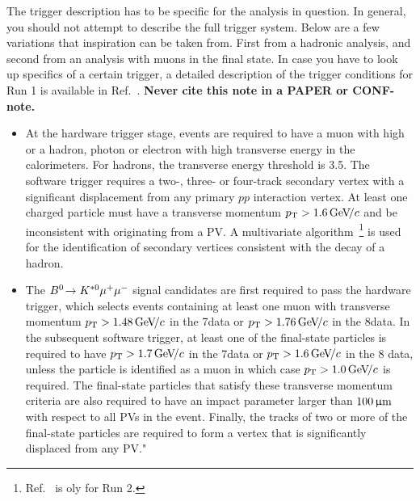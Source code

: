 The trigger description has to be specific for the analysis in
question. In general, you should not attempt to describe the full
trigger system. Below are a few variations that inspiration can be
taken from. First from a hadronic analysis, and second from an
analysis with muons in the final state. In case you have to look 
up specifics of a certain trigger, a detailed description of the trigger 
conditions for Run 1 is available in Ref.~\cite{LHCb-PUB-2014-046}. 
{\bf Never cite this note in a PAPER or CONF-note.} 

\begin{itemize}
\item At the hardware trigger stage, events are required to have a muon with high \pt or a
  hadron, photon or electron with high transverse energy in the calorimeters. For hadrons,
  the transverse energy threshold is 3.5\gev.
  The software trigger requires a two-, three- or four-track
  secondary vertex with a significant displacement from any primary
  $pp$ interaction vertex. At least one charged particle
  must have a transverse momentum $p_{\mathrm{T}} > 1.6\text{\,Ge\kern -0.1em V\!/}c$ and be
  inconsistent with originating from a PV.
  A multivariate algorithm~\cite{BBDT,LHCb-PROC-2015-018}\footnote{Ref.~\cite{LHCb-PROC-2015-018} is oly for Run 2.} is used for
  the identification of secondary vertices consistent with the decay
  of a \bquark hadron.
\item The ${{B}^0}\!\rightarrow {\ensuremath{{K}^{*0}}}{\ensuremath{\mu^+\mu^-}}$ signal candidates are first required
      to pass the hardware trigger, which selects events containing at least
      one muon with transverse momentum $p_{\mathrm{T}}>1.48\text{\,Ge\kern -0.1em V\!/}c$ in the 7\tev data or
      $p_{\mathrm{T}}>1.76\text{\,Ge\kern -0.1em V\!/}c$ in the 8\tev data.  In the subsequent software
      trigger, at least one of the final-state particles is required to 
      have $p_{\mathrm{T}}>1.7\text{\,Ge\kern -0.1em V\!/}c$ in the 7\tev data or $p_{\mathrm{T}}>1.6\text{\,Ge\kern -0.1em V\!/}c$ in the 8\tev 
      data, unless the particle is identified as a muon in which case 
      $p_{\mathrm{T}}>1.0\text{\,Ge\kern -0.1em V\!/}c$ is required. The final-state particles that 
      satisfy these transverse momentum criteria are also required 
      to have an impact parameter larger than $100\,\upmu\text{m}$ with respect 
      to all PVs in the event. Finally, the tracks of two or more of 
      the final-state particles are required to form a vertex that is 
      significantly displaced from any PV." 


\end{itemize}

